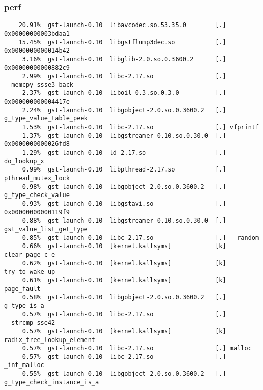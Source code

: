\begin{frame}[fragile]
\frametitle{perf}
\begin{block}{}
\tiny
\begin{verbatim}
    20.91%  gst-launch-0.10  libavcodec.so.53.35.0        [.] 0x00000000003bdaa1                           
    15.45%  gst-launch-0.10  libgstflump3dec.so           [.] 0x0000000000014b42                           
     3.16%  gst-launch-0.10  libglib-2.0.so.0.3600.2      [.] 0x00000000000882c9                           
     2.99%  gst-launch-0.10  libc-2.17.so                 [.] __memcpy_ssse3_back                          
     2.37%  gst-launch-0.10  liboil-0.3.so.0.3.0          [.] 0x000000000004417e                           
     2.24%  gst-launch-0.10  libgobject-2.0.so.0.3600.2   [.] g_type_value_table_peek                      
     1.53%  gst-launch-0.10  libc-2.17.so                 [.] vfprintf                                     
     1.37%  gst-launch-0.10  libgstreamer-0.10.so.0.30.0  [.] 0x0000000000026fd8                           
     1.29%  gst-launch-0.10  ld-2.17.so                   [.] do_lookup_x                                  
     0.99%  gst-launch-0.10  libpthread-2.17.so           [.] pthread_mutex_lock                           
     0.98%  gst-launch-0.10  libgobject-2.0.so.0.3600.2   [.] g_type_check_value                           
     0.93%  gst-launch-0.10  libgstavi.so                 [.] 0x00000000000119f9                           
     0.88%  gst-launch-0.10  libgstreamer-0.10.so.0.30.0  [.] gst_value_list_get_type                      
     0.85%  gst-launch-0.10  libc-2.17.so                 [.] __random                                     
     0.66%  gst-launch-0.10  [kernel.kallsyms]            [k] clear_page_c_e                               
     0.62%  gst-launch-0.10  [kernel.kallsyms]            [k] try_to_wake_up                               
     0.61%  gst-launch-0.10  [kernel.kallsyms]            [k] page_fault                                   
     0.58%  gst-launch-0.10  libgobject-2.0.so.0.3600.2   [.] g_type_is_a                                  
     0.57%  gst-launch-0.10  libc-2.17.so                 [.] __strcmp_sse42                               
     0.57%  gst-launch-0.10  [kernel.kallsyms]            [k] radix_tree_lookup_element                    
     0.57%  gst-launch-0.10  libc-2.17.so                 [.] malloc                                       
     0.57%  gst-launch-0.10  libc-2.17.so                 [.] _int_malloc                                  
     0.55%  gst-launch-0.10  libgobject-2.0.so.0.3600.2   [.] g_type_check_instance_is_a                   

\end{verbatim}
\end{block}
\end{frame}
